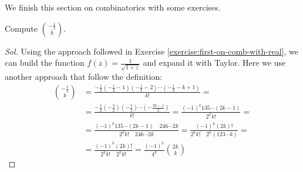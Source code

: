 We finish this section on combinatorics with some exercises.
\begin{exercise}
  Compute ${{ -\frac{1}{2} }\choose{k}} $.
\end{exercise}
\begin{proof}[Sol]
  Using the approach followed in Exercise
  \autoref{exercise:first-on-comb-with-real}, we can build the
  function $f(z) = \frac{1}{\sqrt{1+z}} $ and expand it with
  Taylor. Here we use another approach that follow the definition:
  \begin{displaymath}
    \begin{split}
      {{- \frac{1}{2} }\choose{k}} &= \frac{- \frac{1}{2}(- \frac{1}{2}
        -1)(- \frac{1}{2}-2)\cdots(- \frac{1}{2}-k +1) }{k!} = \\
      &= \frac{- \frac{1}{2}(- \frac{3}{2})(- \frac{5}{2})\cdots(-
        \frac{2k-1}{2}) }{k!} =
      \frac{(-1)^k 1 3 5\cdots (2k-1) }{2^k k!} =\\
      &=\frac{(-1)^k 1 3 5\cdots (2k-1) \quad 2 4 6\cdots 2k } {2^k
        k!\quad 2 4 6\cdots 2k } = \frac{(-1)^k (2k)! }
      {2^k k!\quad 2^k(1 2 3 \cdots k) } =\\
      &= \frac{(-1)^k (2k)! } {2^k k!\quad 2^kk! } =\frac{(-1)^k}{4^k }
      {{2k}\choose{k}}
    \end{split}
  \end{displaymath}


\end{proof}
